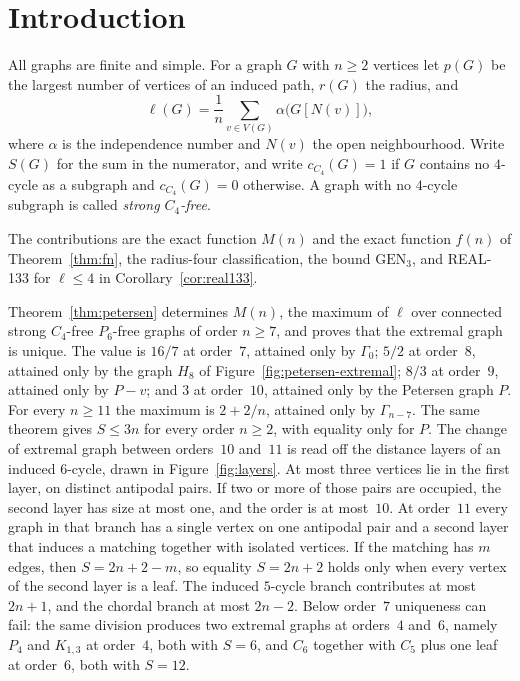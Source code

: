 \documentclass[ASNA]{USG}
\theoremstyle{WBstyletwo}
\numberwithin{equation}{section}
\newcommand{\lr}{\ell}
\newcommand{\pp}{p}
\newcommand{\GEN}{\mathrm{GEN}}
\begin{document}
\section{Introduction}

All graphs are finite and simple. For a graph $G$ with $n\ge 2$ vertices let $\pp(G)$ be the largest number of vertices of an induced path, $r(G)$ the radius, and
\[
\lr(G)=\frac1n\sum_{v\in V(G)}\alpha\bigl(G[N(v)]\bigr),
\]
where $\alpha$ is the independence number and $N(v)$ the open neighbourhood. Write $S(G)$ for the sum in the numerator, and write $c_{C_4}(G)=1$ if $G$ contains no $4$-cycle as a subgraph and $c_{C_4}(G)=0$ otherwise. A graph with no $4$-cycle subgraph is called \emph{strong $C_4$-free}.

The contributions are the exact function $M(n)$ and the exact function $f(n)$ of Theorem~\ref{thm:fn}, the radius-four classification, the bound $\GEN_3$, and REAL-133 for $\lr\le 4$ in Corollary~\ref{cor:real133}.

Theorem~\ref{thm:petersen} determines $M(n)$, the maximum of $\lr$ over connected strong $C_4$-free $P_6$-free graphs of order $n\ge 7$, and proves that the extremal graph is unique. The value is $16/7$ at order~$7$, attained only by $\Gamma_0$; $5/2$ at order~$8$, attained only by the graph $H_8$ of Figure~\ref{fig:petersen-extremal}; $8/3$ at order~$9$, attained only by $P-v$; and $3$ at order~$10$, attained only by the Petersen graph $P$. For every $n\ge 11$ the maximum is $2+2/n$, attained only by $\Gamma_{n-7}$. The same theorem gives $S\le 3n$ for every order $n\ge 2$, with equality only for $P$. The change of extremal graph between orders~$10$ and~$11$ is read off the distance layers of an induced $6$-cycle, drawn in Figure~\ref{fig:layers}. At most three vertices lie in the first layer, on distinct antipodal pairs. If two or more of those pairs are occupied, the second layer has size at most one, and the order is at most~$10$. At order~$11$ every graph in that branch has a single vertex on one antipodal pair and a second layer that induces a matching together with isolated vertices. If the matching has $m$ edges, then $S=2n+2-m$, so equality $S=2n+2$ holds only when every vertex of the second layer is a leaf. The induced $5$-cycle branch contributes at most $2n+1$, and the chordal branch at most $2n-2$. Below order~$7$ uniqueness can fail: the same division produces two extremal graphs at orders~$4$ and~$6$, namely $P_4$ and $K_{1,3}$ at order~$4$, both with $S=6$, and $C_6$ together with $C_5$ plus one leaf at order~$6$, both with $S=12$.
\end{document}
